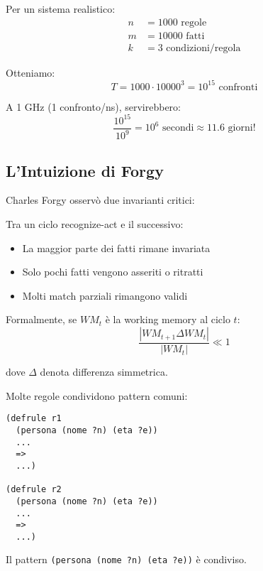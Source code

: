 \begin{esempio}
Per un sistema realistico:
\begin{align*}
n &= 1000 \text{ regole}\\
m &= 10000 \text{ fatti}\\
k &= 3 \text{ condizioni/regola}
\end{align*}

Otteniamo:
\begin{equation}
T = 1000 \cdot 10000^3 = 10^{15} \text{ confronti}
\end{equation}

A 1 GHz (1 confronto/ns), servirebbero:
\begin{equation}
\frac{10^{15}}{10^9} = 10^6 \text{ secondi} \approx 11.6 \text{ giorni!}
\end{equation}
\end{esempio}

\subsection{L'Intuizione di Forgy}

Charles Forgy osservò due invarianti critici:

\begin{osservazione}
Tra un ciclo recognize-act e il successivo:
\begin{itemize}
\item La maggior parte dei fatti rimane invariata
\item Solo pochi fatti vengono asseriti o ritratti
\item Molti match parziali rimangono validi
\end{itemize}

Formalmente, se $WM_t$ è la working memory al ciclo $t$:
\begin{equation}
\frac{|WM_{t+1} \Delta WM_t|}{|WM_t|} \ll 1
\end{equation}

dove $\Delta$ denota differenza simmetrica.
\end{osservazione}

\begin{osservazione}
Molte regole condividono pattern comuni:

\begin{lstlisting}[language=CLIPS]
(defrule r1
  (persona (nome ?n) (eta ?e))
  ...
  =>
  ...)

(defrule r2
  (persona (nome ?n) (eta ?e))
  ...
  =>
  ...)
\end{lstlisting}

Il pattern \texttt{(persona (nome ?n) (eta ?e))} è condiviso.
\end{osservazione}

